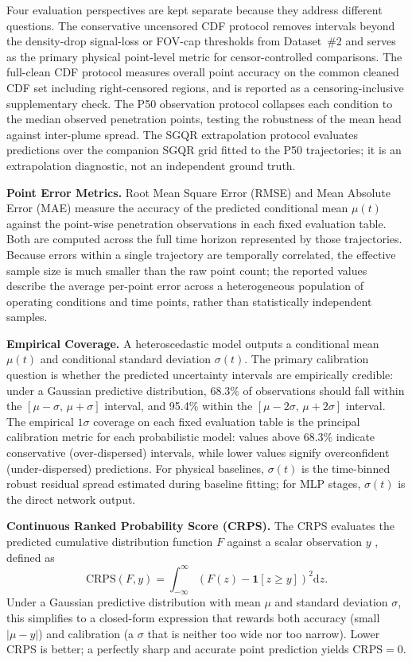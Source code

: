 Four evaluation perspectives are kept separate because they address different questions. The conservative uncensored CDF protocol removes intervals beyond the density-drop signal-loss or FOV-cap thresholds from Dataset~\#2 and serves as the primary physical point-level metric for censor-controlled comparisons. The full-clean CDF protocol measures overall point accuracy on the common cleaned CDF set including right-censored regions, and is reported as a censoring-inclusive supplementary check. The P50 observation protocol collapses each condition to the median observed penetration points, testing the robustness of the mean head against inter-plume spread. The SGQR extrapolation protocol evaluates predictions over the companion SGQR grid fitted to the P50 trajectories; it is an extrapolation diagnostic, not an independent ground truth.

\textbf{Point Error Metrics.} Root Mean Square Error (RMSE) and Mean Absolute Error (MAE) measure the accuracy of the predicted conditional mean $\mu(t)$ against the point-wise penetration observations in each fixed evaluation table. Both are computed across the full time horizon represented by those trajectories. Because errors within a single trajectory are temporally correlated, the effective sample size is much smaller than the raw point count; the reported values describe the average per-point error across a heterogeneous population of operating conditions and time points, rather than statistically independent samples.

\textbf{Empirical Coverage.} A heteroscedastic model outputs a conditional mean $\mu(t)$ and conditional standard deviation $\sigma(t)$. The primary calibration question is whether the predicted uncertainty intervals are empirically credible: under a Gaussian predictive distribution, 68.3\% of observations should fall within the $[\mu-\sigma,\,\mu+\sigma]$ interval, and 95.4\% within the $[\mu-2\sigma,\,\mu+2\sigma]$ interval. The empirical $1\sigma$ coverage on each fixed evaluation table is the principal calibration metric for each probabilistic model: values above 68.3\% indicate conservative (over-dispersed) intervals, while lower values signify overconfident (under-dispersed) predictions. For physical baselines, $\sigma(t)$ is the time-binned robust residual spread estimated during baseline fitting; for MLP stages, $\sigma(t)$ is the direct network output.

\textbf{Continuous Ranked Probability Score (CRPS).} The CRPS evaluates the predicted cumulative distribution function $F$ against a scalar observation $y$ \cite{GneitingRaftery2007CRPS}, defined as
\[
\mathrm{CRPS}(F,y) = \int_{-\infty}^{\infty}\!\left(F(z)-\mathbf{1}[z\geq y]\right)^2\mathrm{d}z.
\]
Under a Gaussian predictive distribution with mean $\mu$ and standard deviation $\sigma$, this simplifies to a closed-form expression that rewards both accuracy (small $|\mu-y|$) and calibration (a $\sigma$ that is neither too wide nor too narrow). Lower CRPS is better; a perfectly sharp and accurate point prediction yields $\mathrm{CRPS}=0$.

